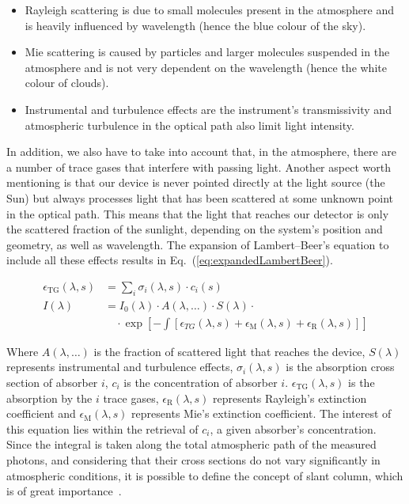 \begin{itemize}
      \item Rayleigh scattering is due to small molecules present in the
          atmosphere and is heavily influenced by wavelength (hence the
          blue colour of the
      sky).
      \item Mie scattering is caused by particles and larger molecules
          suspended in the atmosphere and is not very dependent
      on the wavelength (hence the white colour of clouds).
      \item Instrumental and turbulence effects are the instrument's
          transmissivity and atmospheric turbulence in the optical path
          also limit light intensity.
  \end{itemize}

In addition, we also have to take into account that, in the atmosphere,
there are a number of trace gases that interfere with passing light.
Another aspect worth mentioning is that our device is never pointed
directly at the light source (the Sun) but always processes light that
has been scattered at some unknown point in the optical path. This means
that the light that reaches our detector is only the scattered fraction
of the sunlight, depending on the system's position and geometry, as
well as wavelength. The expansion of Lambert--Beer's equation to include
all these effects results in Eq.~(\ref{eq:expandedLambertBeer}).

\begin{equation}
    \label{eq:expandedLambertBeer}
    \begin{aligned}
        \epsilon_\mathrm{TG}(\lambda, s)&=\sum_{i} \sigma_{i}(\lambda, s)
            \cdot c_{i}(s)\\
       I(\lambda) &= I_0(\lambda) \cdot A(\lambda, \ldots) \cdot
            S(\lambda) \cdot\\
                   &\quad\cdot \exp \left[ -\int \left[
                       \epsilon_{TG}(\lambda, s) +
                           \epsilon_{\mathrm{M}}(\lambda, s) +
                               \epsilon_{\mathrm{R}}(\lambda, s)  \right] \right] 
    \end{aligned}
\end{equation}

Where $A(\lambda, \ldots)$ is the fraction of scattered light that
reaches the device, $S(\lambda)$ represents instrumental and turbulence
effects, $\sigma_{i}(\lambda, s)$ is the absorption cross section of
absorber $i$, $c_{i}$ is the concentration of absorber $i$.
$\epsilon_{\mathrm{TG}}(\lambda, s)$ is the absorption by the $i$ trace
gases, $\epsilon_\mathrm{R}(\lambda, s)$ represents Rayleigh's
extinction coefficient and $\epsilon_\mathrm{M}(\lambda, s)$ represents
Mie's extinction coefficient. The interest of this equation lies within
the retrieval of $c_i$, a given absorber's concentration. Since the
integral is taken along the total atmospheric path of the measured
photons, and considering that their cross sections do not vary
significantly in atmospheric conditions, it is possible to define the
concept of slant column, which is of great
importance~\cite{Merlaud2013}.

